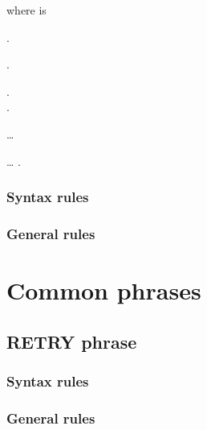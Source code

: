 where  is

\begin{syntax}
  .\newline
  \begin{0-1}
     .
    \begin{0-1}
      . \\
      \imperativestatement .
    \end{0-1} \ldots
  \end{0-1}\ldots\newline
   .
\end{syntax}

\subsubsection{Syntax rules}

\subsubsection{General rules}

\section{Common phrases}

\subsection{RETRY phrase}

\begin{syntax}
\end{syntax}

\subsubsection{Syntax rules}

\subsubsection{General rules}


